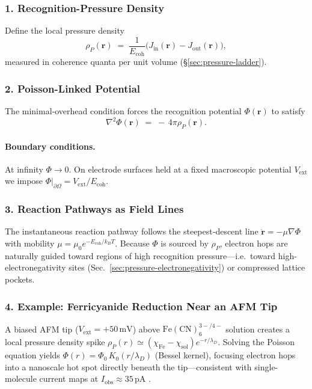 \documentclass[11pt,oneside]{book}
\begin{document}
\subsubsection*{1. Recognition-Pressure Density}

Define the local pressure density
\[
   \rho_P(\mathbf r)
   \;=\;
   \frac{1}{E_{\text{coh}}}
   \bigl(
      J_{\text{in}}(\mathbf r) - J_{\text{out}}(\mathbf r)
   \bigr),
\]
measured in coherence quanta per unit volume
(\S\;\ref{sec:pressure-ladder}).

\subsubsection*{2. Poisson-Linked Potential}

The minimal‐overhead condition forces the recognition potential
\(\Phi(\mathbf r)\) to satisfy
\[
   \boxed{\;
      \nabla^2 \Phi(\mathbf r)
      \;=\;
      -\,4\pi \rho_P(\mathbf r).
   \;}
\]

\paragraph{Boundary conditions.}
At infinity \(\Phi\to0\).
On electrode surfaces held at a fixed macroscopic potential
\(V_{\text{ext}}\) we impose
\(\Phi|_{\partial\Omega} = V_{\text{ext}}/E_{\text{coh}}\).

\subsubsection*{3. Reaction Pathways as Field Lines}

The instantaneous reaction pathway follows the steepest‐descent line
\(\dot{\mathbf r} = -\mu\nabla\Phi\)
with mobility
\(\mu = \mu_0 e^{-E_{\text{coh}}/k_BT}\).
Because \(\Phi\) is sourced by \(\rho_P\), electron hops are naturally
guided toward regions of high recognition pressure—i.e.\ toward
high-electronegativity sites (Sec.~\ref{sec:pressure-electronegativity})
or compressed lattice pockets.

\subsubsection*{4. Example: Ferricyanide Reduction Near an AFM Tip}

A biased AFM tip (\(V_{\text{ext}} = +50\,\text{mV}\))
above \(\mathrm{Fe(CN)_6^{3-/4-}}\) solution creates a local
pressure density spike
\(\rho_P(r) \simeq (\chi_{\text{Fe}}-\chi_\text{sol})e^{-r/\lambda_D}\).
Solving the Poisson equation yields
\(
   \Phi(r) = \Phi_0\,K_0(r/\lambda_D)
\)
(Bessel kernel), focusing electron hops into a nanoscale hot spot
directly beneath the tip—consistent with
single-molecule current maps at
\(I_{\text{obs}}\approx 35\,\text{pA}\) \cite{AFMhot2024}.
\end{document}
